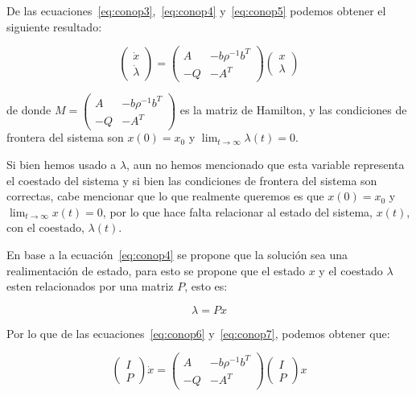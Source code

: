     De las ecuaciones~\ref{eq:conop3},~\ref{eq:conop4} y~\ref{eq:conop5} podemos obtener el siguiente resultado:

    \begin{equation} \label{eq:conop6}
        \begin{pmatrix}
            \dot{x} \\
            \dot{\lambda}
        \end{pmatrix} =
        \begin{pmatrix}
            A & -b \rho^{-1} b^T \\
            - Q & - A^T
        \end{pmatrix}
        \begin{pmatrix}
            x \\
            \lambda
        \end{pmatrix}
    \end{equation}

    de donde $M = \begin{pmatrix} A & -b \rho^{-1} b^T \\ - Q & - A^T \end{pmatrix}$ es la matriz de Hamilton, y las condiciones de frontera del sistema son $x(0) = x_0$ y $\lim_{t \to \infty} \lambda(t) = 0$.

    Si bien hemos usado a $\lambda$, aun no hemos mencionado que esta variable representa el coestado del sistema y si bien las condiciones de frontera del sistema son correctas, cabe mencionar que lo que realmente queremos es que $x(0) = x_0$ y $\lim_{t \to \infty} x(t) = 0$, por lo que hace falta relacionar al estado del sistema, $x(t)$, con el coestado, $\lambda(t)$.

    En base a la ecuación~\ref{eq:conop4} se propone que la solución sea una realimentación de estado, para esto se propone que el estado $x$ y el coestado $\lambda$ esten relacionados por una matriz $P$, esto es:

    \begin{equation} \label{eq:conop7}
        \lambda = P x
    \end{equation}

    Por lo que de las ecuaciones~\ref{eq:conop6} y~\ref{eq:conop7}, podemos obtener que:

    \begin{equation*}
        \begin{pmatrix}
            I \\
            P
        \end{pmatrix} \dot{x}=
        \begin{pmatrix}
            A & -b \rho^{-1} b^T \\
            - Q & - A^T
        \end{pmatrix}
        \begin{pmatrix}
            I \\
            P
        \end{pmatrix} x
    \end{equation*}

